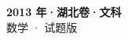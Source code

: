 \documentclass[zihao=-4, a4paper]{ctexart}
\begin{document}
\begin{center}
  {\Large\bfseries 2013 年·湖北卷·文科}\\[4pt]
  {\large 数学 · 试题版}
\end{center}
\medskip
{}

\end{document}
